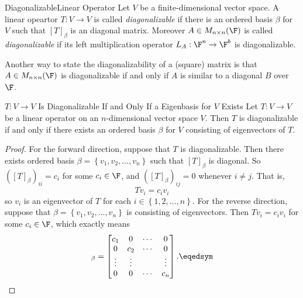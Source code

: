 \documentclass[linearalgebra]{subfiles}
\begin{document}
    \begin{definition}{Diagonalizable}{Linear Operator}
        Let $V$ be a finite-dimensional vector space. A linear opeartor $T:V\to V$ is called \emph{diagonalizable} if there is an ordered basis $\beta$ for $V$ such that $[T]_\beta$ is an diagonal matrix. Moreover $A\in M_{n\times n}(\F)$ is called \emph{diagonalizable} if its left multiplication operator $L_A:\F^n\to\F^b$ is diagonalizable.
    \end{definition}

    \begin{remark}
        Another way to state the diagonalizability of a (square) matrix is that $A\in M_{n\times n}(\F)$ is diagonalizable if and only if $A$ is similar to a diagonal $B$ over $\F$.
    \end{remark}

    \begin{prop}{$T:V\to V$ Is Diagonalizable If and Only If a Eigenbasis for $V$ Exists}
        Let $T:V\to V$ be a linear operator on an $n$-dimensional vector space $V$. Then $T$ is diagonalizable if and only if there exists an ordered basis $\beta$ for $V$ consisting of eigenvectors of $T$.
    \end{prop}

    \begin{proof}
        For the forward direction, suppose that $T$ is diagonalizable. Then there exists ordered basis $\beta = \left\lbrace v_1, v_2, \ldots, v_n \right\rbrace$ such that $\left[ T \right]_\beta$ is diagonal. So $\left( \left[ T \right]_\beta \right)_{ii} = c_i$ for some $c_i\in \F$, and $\left( \left[ T \right]_\beta \right)_{ij} = 0$ whenever $i\neq j$. That is,
        \begin{equation*}
            Tv_i = c_iv_i
        \end{equation*}
        so $v_i$ is an eigenvector of $T$ for each $i\in \left\lbrace 1, 2, \ldots, n \right\rbrace$. For the reverse direction, suppose that $\beta = \left\lbrace v_1, v_2, \ldots, v_n \right\rbrace$ is consisting of eigenvectors. Then $Tv_i = c_iv_i$ for some $c_i\in \F$, which exactly means
        \begin{equation*}
            [T]_\beta = 
            \begin{bmatrix}
                c_1 & 0 & \cdots & 0 \\ 0 & c_2 & \cdots & 0 \\ \vdots & \vdots & & \vdots \\ 0 & 0 & \cdots & c_n
            \end{bmatrix}. \eqedsym
        \end{equation*}
    \end{proof}
\end{document}
